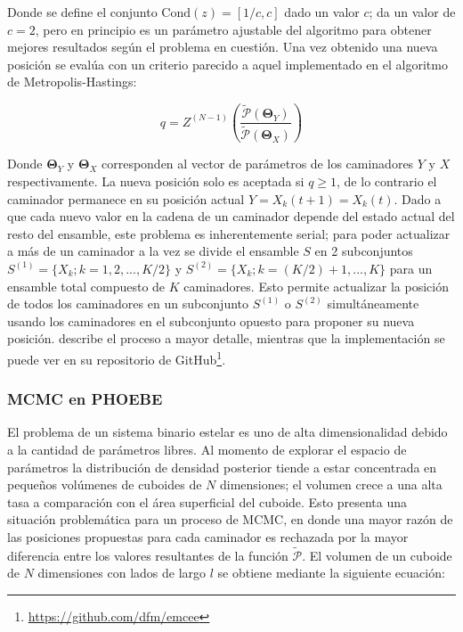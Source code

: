 Donde se define el conjunto $\mathrm{Cond}(z) = [1/c, c]$ dado un valor $c$;
da un valor de $c = 2$, pero en principio es un parámetro ajustable del
algoritmo para obtener mejores resultados según el problema en cuestión. Una vez
obtenido una nueva posición se evalúa con un criterio parecido a aquel
implementado en el algoritmo de Metropolis-Hastings:

\begin{eqfloat}[!ht]
	\centering
	\begin{equation}
		q = Z^{(N - 1)} \left(\frac{\tilde{\mathcal{P}}(\mathbf{\Theta}_Y)}{\tilde{\mathcal{P}}(\mathbf{\Theta}_X)}\right)
	\end{equation}
\end{eqfloat}

Donde $\mathbf{\Theta}_Y$ y $\mathbf{\Theta}_X$ corresponden al vector de
parámetros de los caminadores $Y$ y $X$ respectivamente. La nueva posición solo
es aceptada si $q \geq 1$, de lo contrario el caminador permanece en su posición
actual $Y = X_{k}(t + 1) = X_{k}(t)$. Dado a que cada nuevo valor en la cadena
de un caminador depende del estado actual del resto del ensamble, este problema
es inherentemente serial; para poder actualizar a más de un caminador a la vez
se divide el ensamble $S$ en 2 subconjuntos $S^{(1)} = \{ X_k; k = 1, 2, ...,
K/2 \}$ y $S^{(2)} = \{ X_k; k = (K/2) + 1, ..., K \}$ para un ensamble total
compuesto de $K$ caminadores. Esto permite actualizar la posición de todos los
caminadores en un subconjunto $S^{(1)}$ o $S^{(2)}$ simultáneamente usando los
caminadores en el subconjunto opuesto para proponer su nueva posición.
 describe el proceso a mayor detalle,
mientras que la implementación se puede ver en su repositorio de
GitHub\footnote{\url{https://github.com/dfm/emcee}}.

\subsubsection{MCMC en PHOEBE}

El problema de un sistema binario estelar es uno de alta dimensionalidad debido
a la cantidad de parámetros libres. Al momento de explorar el espacio de
parámetros la distribución de densidad posterior tiende a estar concentrada en
pequeños volúmenes de cuboides de $N$ dimensiones; el volumen crece a una alta
tasa a comparación con el área superficial del cuboide. Esto presenta una
situación problemática para un proceso de MCMC, en donde una mayor razón de las
posiciones propuestas para cada caminador es rechazada por la mayor diferencia
entre los valores resultantes de la función $\tilde{\mathcal{P}}$. El volumen de
un cuboide de $N$ dimensiones con lados de largo $l$ se obtiene mediante la
siguiente ecuación:

